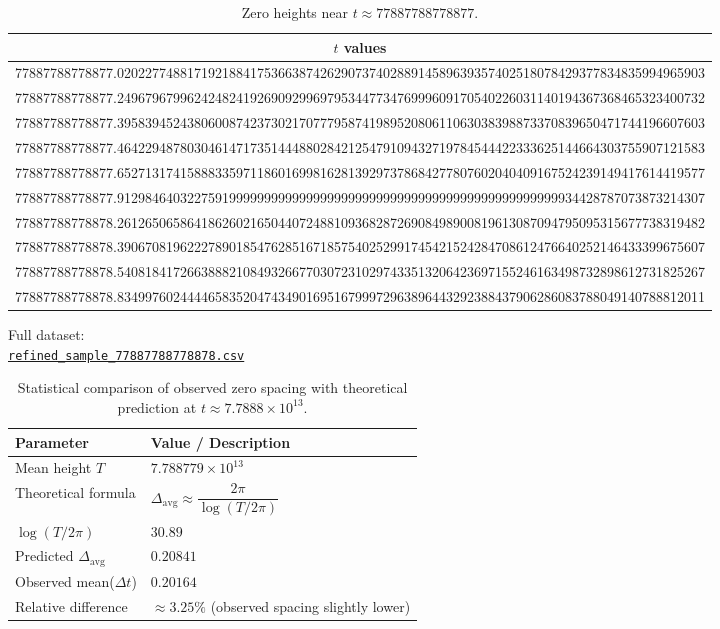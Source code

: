 \documentclass[11pt,a4paper]{article}
\begin{document}
\begin{table}[H]
\centering
\small
\caption{Zero heights near $t \approx 77887788778877$.}
\begin{tabular}{c}
\hline
\textbf{$t$ values} \\
\hline
77887788778877.020227748817192188417536638742629073740288914589639357402518078429377834835994965903 \\
77887788778877.249679679962424824192690929969795344773476999609170540226031140194367368465323400732 \\
77887788778877.395839452438060087423730217077795874198952080611063038398873370839650471744196607603 \\
77887788778877.464229487803046147173514448802842125479109432719784544422333625144664303755907121583 \\
77887788778877.652713174158883359711860169981628139297378684277807602040409167524239149417614419577 \\
77887788778877.912984640322759199999999999999999999999999999999999999999999999934428787073873214307 \\
77887788778878.261265065864186260216504407248810936828726908498900819613087094795095315677738319482 \\
77887788778878.390670819622278901854762851671857540252991745421524284708612476640252146433399675607 \\
77887788778878.540818417266388821084932667703072310297433513206423697155246163498732898612731825267 \\
77887788778878.834997602444465835204743490169516799972963896443292388437906286083788049140788812011 \\
\hline
\end{tabular}
\label{tab:t_values_77887788778878}
\end{table}

\noindent
Full dataset: \\
\href{https://github.com/zjore/z-research/blob/main/datasets/refined_sample_77887788778878.csv}{\texttt{refined\_sample\_77887788778878.csv}}

\begin{table}[H]
\centering
\caption{Statistical comparison of observed zero spacing with theoretical prediction at $t \approx 7.7888\times10^{13}$.}
\begin{tabular}{ll}
\hline
\textbf{Parameter} & \textbf{Value / Description} \\
\hline
Mean height $T$ & $7.788779\times10^{13}$ \\
Theoretical formula & $\Delta_{\mathrm{avg}} \approx \dfrac{2\pi}{\log(T / 2\pi)}$ \\
$\log(T / 2\pi)$ & $30.89$ \\
Predicted $\Delta_{\mathrm{avg}}$ & $0.20841$ \\
Observed mean($\Delta t$) & $0.20164$ \\
Relative difference & $\approx 3.25\%$ (observed spacing slightly lower) \\
\hline
\end{tabular}
\label{tab:spacing_comparison_77887788778878}
\end{table}
\end{document}
